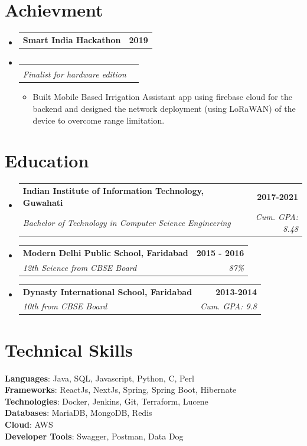 \documentclass[letterpaper,11pt]{article}
\makeatletter
\newcommand{\resumeItem}[1]{
  \item\small{
    {#1 \vspace{-2pt}}
  }
}
\newcommand{\resumeSubheading}[4]{
  \vspace{-2pt}\item
    \begin{tabular*}{1.0\textwidth}[t]{l@{\extracolsep{\fill}}r}
      \textbf{#1} & \textbf{\small #2} \\
      \textit{\small#3} & \textit{\small #4} \\
    \end{tabular*}\vspace{-7pt}
}
\newcommand{\resumeProjectHeading}[2]{
    \item
    \begin{tabular*}{1.001\textwidth}{l@{\extracolsep{\fill}}r}
      \small#1 & \textbf{\small #2}\\
    \end{tabular*}\vspace{-7pt}
}
\newcommand{\resumeSubHeadingListStart}{\begin{itemize}[leftmargin=0.0in, label={}]}
\newcommand{\resumeSubHeadingListEnd}{\end{itemize}}
\newcommand{\resumeItemListStart}{\begin{itemize}}
\newcommand{\resumeItemListEnd}{\end{itemize}\vspace{-5pt}}
\makeatother
\begin{document}
\section{Achievment}
\vspace{-5pt}
\resumeSubHeadingListStart
\resumeProjectHeading
{\textbf{Smart India Hackathon}}{2019}
\vspace{-28pt}
\resumeSubheading
{}{}
{Finalist for hardware edition}{}
\resumeItemListStart
\resumeItem{
Built Mobile Based
Irrigation Assistant app using
firebase cloud for the backend and
designed the network deployment
(using LoRaWAN) of the device to
overcome range limitation.}
\resumeItemListEnd

\resumeSubHeadingListEnd
\vspace{-15pt}

\section{Education}
\resumeSubHeadingListStart
\resumeSubheading
{Indian Institute of Information Technology, Guwahati}{2017-2021}
{Bachelor of Technology in Computer Science Engineering}{Cum. GPA: 8.48}

\resumeSubheading
{Modern Delhi Public School, Faridabad}{2015 - 2016}
{12th Science from CBSE Board}{87\%}

\resumeSubheading
{Dynasty International School, Faridabad}{2013-2014}
{10th from CBSE Board}{Cum. GPA: 9.8}

\resumeSubHeadingListEnd

%
\section{Technical Skills}
\begin{itemize}[leftmargin=0.01in, label={}]
  \small{\item{
        \textbf{Languages}{: Java, SQL, Javascript, Python, C, Perl} \\
        \textbf{Frameworks}{: ReactJs, NextJs, Spring, Spring Boot, Hibernate} \\
        \textbf{Technologies}{: Docker, Jenkins, Git, Terraform, Lucene} \\
        \textbf{Databases}{: MariaDB, MongoDB, Redis } \\
        \textbf{Cloud}{: AWS} \\
        \textbf{Developer Tools}{: Swagger, Postman, Data Dog} \\
        }}
\end{itemize}
\vspace{-16pt}
\end{document}
